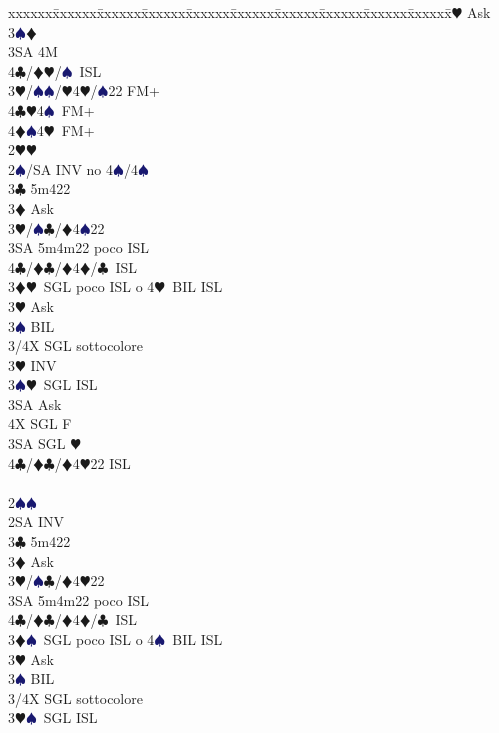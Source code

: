 \documentclass[a4paper,italian]{article}
\newcommand{\BC}{\textcolor{OliveGreen}{$\clubsuit$}}
\newcommand{\BD}{\textcolor{RedOrange}{$\vardiamondsuit$}}
\newcommand{\BH}{\textcolor{Red2}{$\varheartsuit${}}}
\newcommand{\BS}{\textcolor{MidnightBlue}{$\spadesuit${}}}
\newenvironment{bidtable}
{\begin{tabbing}

    xxxxxx\=xxxxxx\=xxxxxx\=xxxxxx\=xxxxxx\=xxxxxx\=xxxxxx\=xxxxxx\=xxxxxx\=xxxxxx\=\kill}
{\end{tabbing} }%
\begin{document}
\begin{multicols}{2}
\begin{bidtable}
        3\BH \> Ask\+\\
        3\BS {}\BD \\
        3SA \> 4M\\
        4\BC/\BD {}\BH /\BS\ ISL\-\-\\
        3\BH/\BS {}\BS /\BH 4\BH /\BS 22 FM+\\
        4\BC {}\BH 4\BS\ FM+\\
        4\BD {}\BS 4\BH\ FM+\-\\
        2\BH {}\BH \+\\
        2\BS/SA \> INV no 4\BS/4\BS \\
        3\BC \> 5m422\+\\
        3\BD \> Ask\+\\
        3\BH/\BS {}\BC /\BD 4\BS 22\\
        3SA \> 5m4m22 poco ISL\\
        4\BC/\BD {}\BC /\BD 4\BD /\BC\ ISL\-\-\\
        3\BD {}\BH\ SGL poco ISL o 4\BH\ BIL ISL\+\\
        3\BH \> Ask\+\\
        3\BS \> BIL\\
        3/4X \> SGL sottocolore\-\-\\
        3\BH \> INV\\
        3\BS {}\BH\ SGL ISL\+\\
        3SA \> Ask\+\\
        4X \> SGL F\-\-\\
        3SA \> SGL \BH \\
        4\BC/\BD {}\BC /\BD 4\BH 22 ISL\-\\
        \\
        2\BS {}\BS \+\\
        2SA \> INV\\
        3\BC \> 5m422\+\\
        3\BD \> Ask\+\\
        3\BH/\BS {}\BC /\BD 4\BH 22\\
        3SA \> 5m4m22 poco ISL\\
        4\BC/\BD {}\BC /\BD 4\BD /\BC\ ISL\-\-\\
        3\BD {}\BS\ SGL poco ISL o 4\BS\ BIL ISL\+\\
        3\BH \> Ask\+\\
        3\BS \> BIL\\
        3/4X \> SGL sottocolore\-\-\\
        3\BH {}\BS\ SGL ISL\+\\

\end{bidtable}
\end{multicols}
\end{document}
